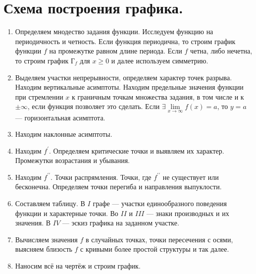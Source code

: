 \section{Схема построения графика.}
\begin{enumerate}
	\item Определяем мнодество задания функции. Исследуем функцию на периодичность и четность. Если функция периодична, то строим график функции $f$ на промежутке равном длине периода. Если $f$ четна, либо нечетна, то строим график Г$_f$ для $x\geq 0$ и далее используем симметрию.
	\item Выделяем участки непрерывности, определяем характер точек разрыва. Находим вертикальные асимптоты. Находим предельные значения функции при стремлении $x$ к граничным точкам множества задания, в том числе и к $\pm \infty$, если функция позволяет это сделать. Если $\exists\lim\limits_{x\to\infty} f(x) = a$, то $y = a$ --- горизонтальная асимптота.
	\item Находим наклонные асимптоты.
	\item Находим $f^\prime$. Определяем критические точки и выявляем их характер. Промежутки возрастания и убывания.
	\item Находим $f^{\prime\prime}$. Точки распрямления. Точки, где $f^{\prime\prime}$ не существует или бесконечна. Определяем точки перегиба и направления выпуклости.
	\item Составляем таблицу. В $I$ графе --- участки единообразного поведения функции и характерные точки. Во $II$ и $III$ --- знаки производных и их значения. В $IV$ --- эскиз графика на заданном участке.
	\item Вычисляем значения $f$ в случайных точках, точки пересечения с осями, выясняем близость $f$ с кривыми более простой структуры и так далее.
	\item Наносим всё на чертёж и строим график.
\end{enumerate}
%
%
%
%